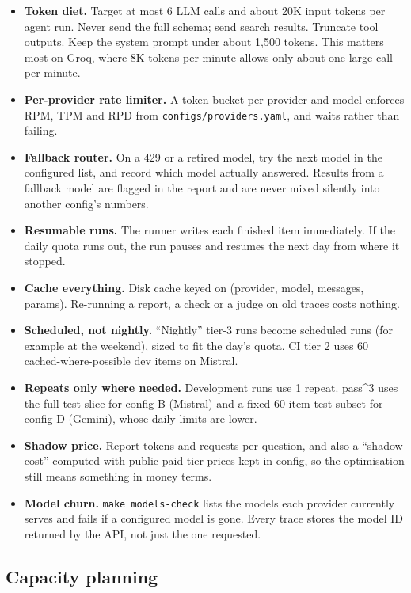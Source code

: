 \documentclass[11pt,a4paper]{article}
\newcommand{\code}[1]{\texttt{\small #1}}
\begin{document}
\begin{itemize}
\item \textbf{Token diet.} Target at most 6 LLM calls and about 20K input tokens per agent run.
Never send the full schema; send search results. Truncate tool outputs. Keep the system prompt
under about 1{,}500 tokens. This matters most on Groq, where 8K tokens per minute allows only
about one large call per minute.
\item \textbf{Per-provider rate limiter.} A token bucket per provider and model enforces RPM, TPM and
RPD from \code{configs/providers.yaml}, and waits rather than failing.
\item \textbf{Fallback router.} On a 429 or a retired model, try the next model in the configured
list, and record which model actually answered. Results from a fallback model are flagged in the
report and are never mixed silently into another config's numbers.
\item \textbf{Resumable runs.} The runner writes each finished item immediately. If the daily quota
runs out, the run pauses and resumes the next day from where it stopped.
\item \textbf{Cache everything.} Disk cache keyed on (provider, model, messages, params). Re-running
a report, a check or a judge on old traces costs nothing.
\item \textbf{Scheduled, not nightly.} ``Nightly'' tier-3 runs become scheduled runs (for example at
the weekend), sized to fit the day's quota. CI tier 2 uses 60 cached-where-possible dev items on
Mistral.
\item \textbf{Repeats only where needed.} Development runs use 1 repeat. pass\^{}3 uses the full test slice
for config B (Mistral) and a fixed 60-item test subset for config D (Gemini), whose daily limits are lower.
\item \textbf{Shadow price.} Report tokens and requests per question, and also a ``shadow cost'' computed
with public paid-tier prices kept in config, so the optimisation still means something in money
terms.
\item \textbf{Model churn.} \code{make models-check} lists the models each provider currently serves and
fails if a configured model is gone. Every trace stores the model ID returned by the API, not
just the one requested.
\end{itemize}

\subsection{Capacity planning}
\end{document}
